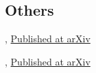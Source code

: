\documentclass[10pt,a4paper,roman,dvipdfmx]{moderncv}
\begin{document}
\subsection{Others}

\begin{etaremune}
	\item {}, \href{http://arxiv.org/abs/1804.05927}{Published at arXiv}
	\item {}
	\item {}
	\item {}, \href{https://arxiv.org/abs/1708.02147}{Published at arXiv}
	\item {}
\end{etaremune}
\end{document}
